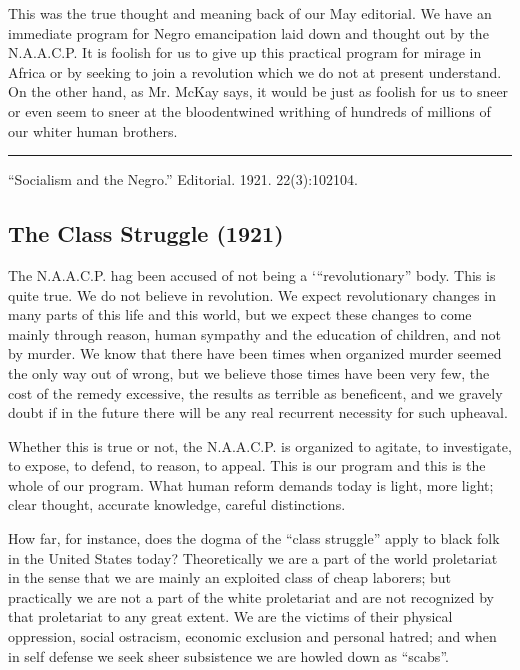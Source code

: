 \documentclass[letterpaper,10pt,english]{jupyterBook}
\begin{document}
\sphinxAtStartPar
This was the true thought and meaning back of our May editorial. We have an immediate program for Negro emancipation laid down and thought out by the N.A.A.C.P. It is foolish for us to give up this practical program for mirage in Africa or by seeking to join a revolution which we do not at present understand. On the other hand, as Mr. McKay says, it would be just as foolish for us to sneer or even seem to sneer at the blood\sphinxhyphen{}entwined writhing of hundreds of millions of our whiter human brothers.


\bigskip\hrule\bigskip


\sphinxAtStartPar
{} “Socialism and the Negro.” Editorial. 1921. 22(3):102\sphinxhyphen{}104.


\subsection{The Class Struggle (1921)}
\label{\detokenize{Volumes/22/04/class_struggle:the-class-struggle-1921}}\label{\detokenize{Volumes/22/04/class_struggle::doc}}
\sphinxAtStartPar
The N.A.A.C.P. hag been accused of not being a ‘“revolutionary” body. This is quite true. We do not believe in revolution. We expect revolutionary changes in many parts of this life and this world, but we expect these changes to come mainly through reason, human sympathy and the education of children, and not by murder. We know that there have been times when organized murder seemed the only way out of wrong, but we believe those times have been very few, the cost of the remedy excessive, the results as terrible as beneficent, and we gravely doubt if in the future there will be any real recurrent necessity for such upheaval.

\sphinxAtStartPar
Whether this is true or not, the N.A.A.C.P. is organized to agitate, to investigate, to expose, to defend, to reason, to appeal. This is our program and this is the whole of our program. What human reform demands today is light, more light; clear thought, accurate knowledge, careful distinctions.

\sphinxAtStartPar
How far, for instance, does the dogma of the “class struggle” apply to black folk in the United States today? Theoretically we are a part of the world proletariat in the sense that we are mainly an exploited class of cheap laborers; but practically we are not a part of the white proletariat and are not recognized by that proletariat to any great extent. We are the victims of their physical oppression, social ostracism, economic exclusion and personal hatred; and when in self defense we seek sheer subsistence we are howled down as “scabs”.
\end{document}

